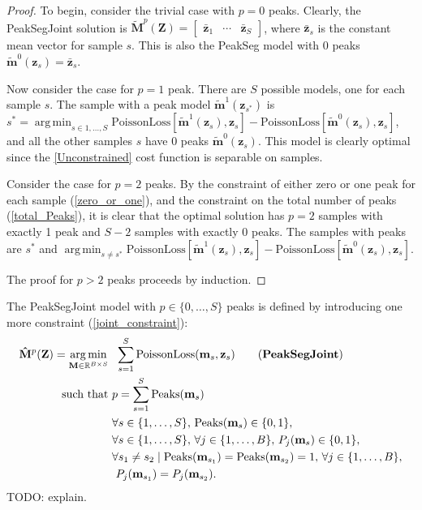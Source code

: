 \documentclass{article} %
\DeclareMathOperator*{\argmin}{arg\,min}
\DeclareMathOperator*{\Peaks}{Peaks}
\newcommand{\RR}{\mathbb R}
\begin{document}
\begin{proof}
  To begin, consider the trivial case with $p=0$ peaks. Clearly, the
  PeakSegJoint solution is
  $\mathbf{\tilde M}^p(\mathbf Z) = \left[
    \begin{array}{ccc}
      \mathbf{\bar z}_1 & 
      \cdots &
      \mathbf{\bar z}_S 
    \end{array}
  \right]$, where $\mathbf{\bar z}_s$ is the constant mean vector for
  sample $s$. This is also the PeakSeg model with 0 peaks $\mathbf{\tilde
    m}^0(\mathbf z_s)=\mathbf{\bar z}_s$. 
  
  Now consider the case for $p=1$ peak. There are $S$ possible models,
  one for each sample $s$. The sample with a peak model
  $\mathbf{\tilde m}^1(\mathbf z_{s^*})$ is $s^*=\argmin_{s\in
    1,\dots, S} \textrm{PoissonLoss}\left[ \mathbf{\tilde m}^1(\mathbf
    z_s), \mathbf z_s \right] - \textrm{PoissonLoss}\left[
    \mathbf{\tilde m}^0(\mathbf z_s), \mathbf z_s \right]$, and all
  the other samples $s$ have 0 peaks $\mathbf{\tilde m}^0(\mathbf
  z_{s})$. This model is clearly optimal since the \ref{Unconstrained} cost
  function is separable on samples.

  Consider the case for $p=2$ peaks. By the constraint of either zero
  or one peak for each sample (\ref{zero_or_one}), and the constraint
  on the total number of peaks (\ref{total_Peaks}), it is clear that
  the optimal solution has $p=2$ samples with exactly 1 peak and $S-2$
  samples with exactly 0 peaks. The samples with peaks are $s^*$ and
  $\argmin_{s\neq s^*} \textrm{PoissonLoss}\left[ \mathbf{\tilde
      m}^1(\mathbf z_s), \mathbf z_s \right] -
  \textrm{PoissonLoss}\left[ \mathbf{\tilde m}^0(\mathbf z_s), \mathbf
    z_s \right]$.

  The proof for $p>2$ peaks proceeds by induction.
\end{proof}

The PeakSegJoint model with $p\in\{0, \dots, S\}$ peaks is defined by
introducing one more constraint (\ref{joint_constraint}):
\begin{align}
  \label{PeakSegJoint}
  \mathbf{\hat M}^p(\mathbf Z)  =
  \argmin_{\mathbf M\in\RR^{B\times S}} &\ \ 
  \sum_{s=1}^S 
  \text{PoissonLoss}(\mathbf m_s, \mathbf z_s) 
  \tag{\textbf{PeakSegJoint}}
  \\
  \text{such that} &\ p = \sum_{s=1}^S \Peaks(\mathbf m_s)
  \nonumber
  \\
  &\ \forall s\in\{1, \dots, S\},\, 
  \Peaks(\mathbf m_s)\in\{0, 1\},  
  \nonumber
  \\
  &\ \forall s\in\{1, \dots, S\},\,
  \forall j\in\{1, \dots, B\},\, P_j(\mathbf m_s) \in\{0, 1\},
  \nonumber
  \\
  &\ \forall s_1\neq s_2\mid
  \nonumber
  \Peaks(\mathbf m_{s_1})=\Peaks(\mathbf  m_{s_2})=1,\,
  \forall j\in\{1, \dots, B\},\\
  &\ \ P_j(\mathbf m_{s_1}) = P_j(\mathbf m_{s_2}).
  \label{joint_constraint}
\end{align}
TODO: explain.
\end{document}

